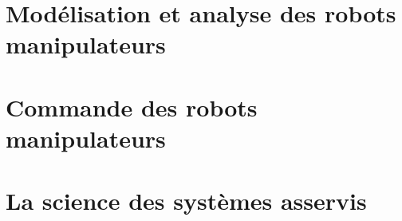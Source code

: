 \documentclass[letterpaper,oneside,french]{book}
\begin{document}


\setcounter{tocdepth}{0}
\noptcrule

{\hypersetup{linkcolor=black}
\doparttoc[n]
\tableofcontents
\newpage
}

\part{Modélisation et analyse des robots manipulateurs}
\label{sec:manip}
{\hypersetup{linkcolor=black}
\parttoc
}












\part{Commande des robots manipulateurs}
\label{sec:manip_control}
{\hypersetup{linkcolor=black}
\parttoc
}








\part{La science des systèmes asservis}
\label{sec:feedback}
{\hypersetup{linkcolor=black}
\parttoc
}
\end{document}
